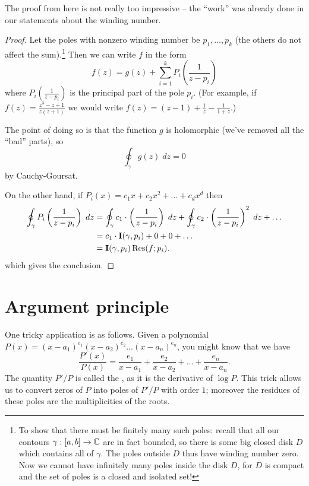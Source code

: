 The proof from here is not really too impressive -- the ``work'' was already
done in our statements about the winding number.
\begin{proof}
	Let the poles with nonzero winding number be $p_1, \dots, p_k$ (the others do not affect the sum).\footnote{
		To show that there must be finitely many such poles: recall that all our contours $\gamma : [a,b] \to \mathbb C$
		are in fact bounded, so there is some big closed disk $D$ which contains all of $\gamma$.
		The poles outside $D$ thus have winding number zero.
		Now we cannot have infinitely many poles inside the disk $D$, for $D$ is compact and the
		set of poles is a closed and isolated set!}
	Then we can write $f$ in the form
	\[
		f(z) = g(z) + \sum_{i=1}^k P_i\left( \frac{1}{z-p_i} \right)
	\]
	where $P_i\left( \frac{1}{z-p_i} \right)$ is the principal part of the pole $p_i$.
	(For example, if $f(z) = \frac{z^3-z+1}{z(z+1)}$ we would write $f(z) = (z-1) + \frac1z - \frac1{1+z}$.)

	The point of doing so is that the function $g$ is holomorphic (we've removed all the ``bad'' parts), so
	\[ \oint_{\gamma} g(z) \; dz = 0 \]
	by Cauchy-Goursat.

	On the other hand, if $P_i(x) = c_1x + c_2x^2 + \dots + c_d x^d$ then
	\begin{align*}
		\oint_{\gamma} P_i\left( \frac{1}{z-p_i} \right) \; dz
		&=
		\oint_{\gamma} c_1 \cdot \left( \frac{1}{z-p_i} \right) \; dz
		+ \oint_{\gamma} c_2 \cdot \left( \frac{1}{z-p_i} \right)^2 \; dz
		+ \dots \\
		&= c_1 \cdot \operatorname{\mathbf I}(\gamma, p_i) + 0 + 0 + \dots \\
		&= \operatorname{\mathbf I}(\gamma, p_i) \operatorname{Res}(f; p_i).
	\end{align*}
	which gives the conclusion.
\end{proof}

\section{Argument principle}
One tricky application is as follows.
Given a polynomial $P(x) = (x-a_1)^{e_1}(x-a_2)^{e_2}\dots(x-a_n)^{e_n}$, you might know that we have
\[ \frac{P'(x)}{P(x)} = \frac{e_1}{x-a_1} + \frac{e_2}{x-a_2} + \dots + \frac{e_n}{x-a_n}. \]
The quantity $P'/P$ is called the , as it is the derivative of $\log P$.
This trick allows us to convert zeros of $P$ into poles of $P'/P$ with order $1$;
moreover the residues of these poles are the multiplicities of the roots.

